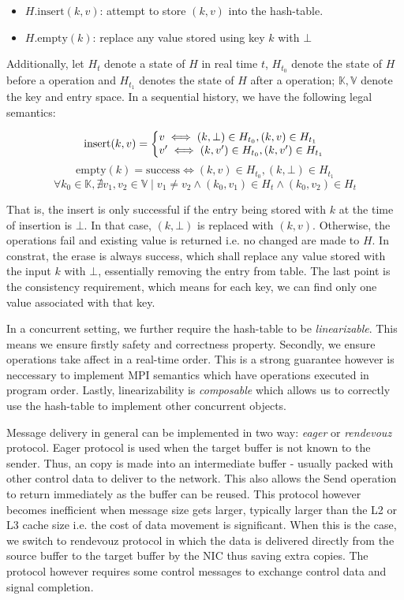 \documentclass{sig-alternate-05-2015}
\begin{document}
\begin{itemize}
  \item $H.\text{insert}(k,v)$: attempt to store $(k,v)$ into the hash-table.
  \item $H.\text{empty}(k)$: replace any value stored using key $k$ with $\bot$
\end{itemize}

Additionally, let $H_t$ denote a state of $H$ in real time $t$, $H_{t_0}$ denote the
state of $H$ before a operation and $H_{t_1}$ denotes the state of $H$ after a
operation; $\mathbb{K}, \mathbb{V}$ denote the key and entry space. In a
sequential history, we have the following legal semantics:

\[
  \text{insert}(k, v) = \left\{
    \begin{array}{@{}l@{\thinspace}l}
      v \iff (k,\bot) \in H_{t_0}, (k,v) \in H_{t_1}\\
      v' \iff (k,v') \in H_{t_0}, (k,v') \in H_{t_1}
    \end{array}
    \right.
\]
\[
  \text{empty}(k) = \text{success} \iff  (k,v) \in H_{t_0}, (k,\bot) \in H_{t_1}
\]
\[
  \forall k_0 \in \mathbb{K}, \nexists {v_1, v_2 \in \mathbb{V}}
    \mid {{v_1 \ne v_2} \wedge {(k_0, v_1) \in H_{t} \wedge (k_0, v_2) \in H_{t}}}
\]

That is, the insert is only successful if the entry being stored with $k$ at
the time of insertion is $\bot$.  In that case, $(k,\bot)$ is replaced with
$(k, v)$. Otherwise, the operations fail and existing value is returned i.e. no
changed are made to $H$. In constrat, the erase is always success, which shall
replace any value stored with the input $k$ with $\bot$, essentially removing
the entry from table.  The last point is the consistency requirement, which
means for each key, we can find only one value associated with that key.

In a concurrent setting, we further require the hash-table to be
\textit{linearizable}.  This means we ensure firstly safety and correctness
property. Secondly, we ensure operations take affect in a real-time order.
This is a strong guarantee however is neccessary to implement MPI semantics
which have operations executed in program order. Lastly, linearizability is
\textit{composable} which allows us to correctly use the hash-table to
implement other concurrent objects.

Message delivery in general can be implemented in two way: \textit{eager} or \textit{rendevouz}
protocol. Eager protocol is used when the target buffer is not known to the
sender. Thus, an copy is made into an intermediate buffer - usually packed with
other control data to deliver to the network. This also allows the Send
operation to return immediately as the buffer can be reused.  This protocol
however becomes inefficient when message size gets larger, typically larger
than the L2 or L3 cache size i.e. the cost of data movement is significant.
When this is the case, we switch to rendevouz protocol in which the data is
delivered directly from the source buffer to the target buffer by the NIC thus
saving extra copies.  The protocol however requires some control messages to
exchange control data and signal completion.
\end{document}
